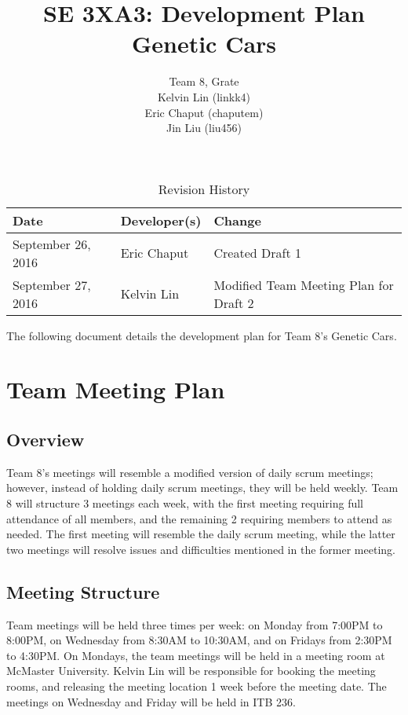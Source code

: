 \documentclass{article}
\title{SE 3XA3: Development Plan\\Genetic Cars}
\author{Team 8, Grate
		\\ Kelvin Lin (linkk4)
		\\ Eric Chaput (chaputem)
		\\ Jin Liu (liu456)
}
\date{}
\begin{document}
\begin{table}[hp]
\caption{Revision History} \label{TblRevisionHistory}
\begin{tabularx}{\textwidth}{llX}
\toprule
\textbf{Date} & \textbf{Developer(s)} & \textbf{Change}\\
\midrule
September 26, 2016 & Eric Chaput & Created Draft 1\\
September 27, 2016 & Kelvin Lin & Modified Team Meeting Plan for Draft 2\\
\bottomrule
\end{tabularx}
\end{table}

\newpage

\maketitle


The following document details the development plan for Team 8's Genetic Cars.

\section{Team Meeting Plan}

\subsection{Overview}
Team 8's meetings will resemble a modified version of daily scrum meetings; 
however, instead of holding daily scrum meetings, they will be held weekly. Team 
8 will structure 3 meetings each week, with the first meeting requiring full 
attendance of all members, and the remaining 2 requiring members to attend as 
needed. The first meeting will resemble the daily scrum meeting, while the 
latter two meetings will resolve issues and difficulties mentioned in the former 
meeting.

\subsection{Meeting Structure}
Team meetings will be held three times per week: on Monday from 7:00PM to 
8:00PM, on Wednesday from 8:30AM to 10:30AM, and on Fridays from 2:30PM to 
4:30PM. On Mondays, the team meetings will be held in a meeting room at McMaster 
University. Kelvin Lin will be responsible for booking the meeting rooms, and 
releasing the meeting location 1 week before the meeting date. The meetings on 
Wednesday and Friday will be held in ITB 236.
\end{document}
